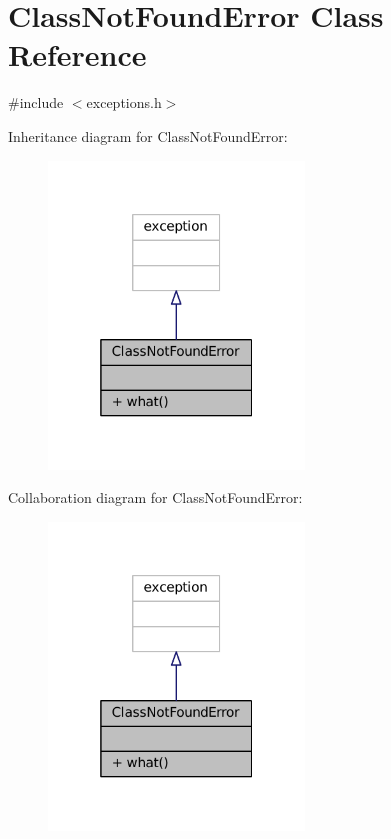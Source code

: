 \hypertarget{classClassNotFoundError}{}\section{Class\+Not\+Found\+Error Class Reference}
\label{classClassNotFoundError}


{\ttfamily \#include $<$exceptions.\+h$>$}



Inheritance diagram for Class\+Not\+Found\+Error\+:
\nopagebreak
\begin{figure}[H]
\begin{center}
\leavevmode
\includegraphics[width=193pt]{classClassNotFoundError__inherit__graph}
\end{center}
\end{figure}


Collaboration diagram for Class\+Not\+Found\+Error\+:
\nopagebreak
\begin{figure}[H]
\begin{center}
\leavevmode
\includegraphics[width=193pt]{classClassNotFoundError__coll__graph}
\end{center}
\end{figure}
